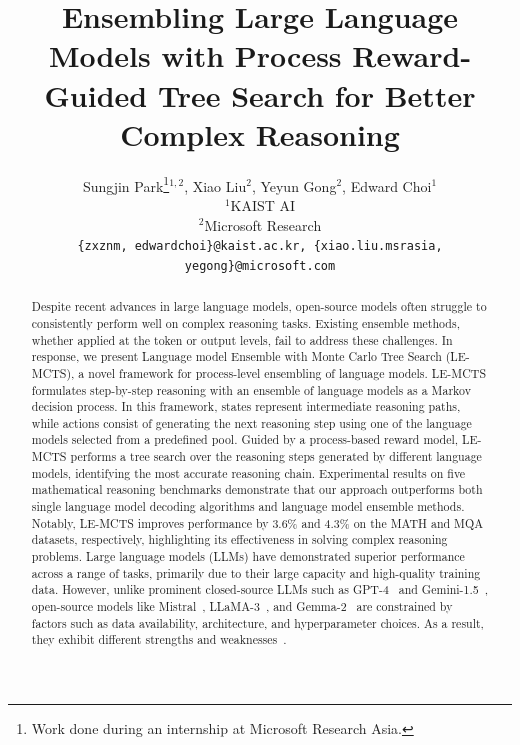 \documentclass[11pt]{article}
\title{Ensembling Large Language Models with Process Reward-Guided Tree Search for Better Complex Reasoning}
\author{
  Sungjin Park\thanks{Work done during an internship at Microsoft Research Asia.}$^{1,2}$, Xiao Liu$^{2}$, Yeyun Gong$^{2}$, Edward Choi$^{1}$ \\
  $^{1}$KAIST AI \\
  $^{2}$Microsoft Research \\
  \texttt{\{zxznm, edwardchoi\}@kaist.ac.kr, \{xiao.liu.msrasia, yegong\}@microsoft.com}\\
}
\begin{document}
\maketitle
\begin{abstract}
Despite recent advances in large language models, open-source models often struggle to consistently perform well on complex reasoning tasks. 
Existing ensemble methods, whether applied at the token or output levels, fail to address these challenges.
In response, we present Language model Ensemble with Monte Carlo Tree Search (LE-MCTS), a novel framework for process-level ensembling of language models. 
LE-MCTS formulates step-by-step reasoning with an ensemble of language models as a Markov decision process. 
In this framework, states represent intermediate reasoning paths, while actions consist of generating the next reasoning step using one of the language models selected from a predefined pool. 
Guided by a process-based reward model, LE-MCTS performs a tree search over the reasoning steps generated by different language models, identifying the most accurate reasoning chain. 
Experimental results on five mathematical reasoning benchmarks demonstrate that our approach outperforms both single language model decoding algorithms and language model ensemble methods.
Notably, LE-MCTS improves performance by 3.6\% and 4.3\% on the MATH and MQA datasets, respectively, highlighting its effectiveness in solving complex reasoning problems.
Large language models (LLMs) have demonstrated superior performance across a range of tasks, primarily due to their large capacity and high-quality training data. 
However, unlike prominent closed-source LLMs such as GPT-4~\citep{openai-etal-2023-gpt4} and Gemini-1.5~\cite{gemini-etal-2024-gemini}, open-source models like Mistral~\citep{jiang-etal-2023-mistral}, LLaMA-3~\citep{dubey-etal-2024-llama3}, and Gemma-2~\citep{gemma-etal-2024-gemma2} are constrained by factors such as data availability, architecture, and hyperparameter choices.
As a result, they exhibit different strengths and weaknesses~\citep{jiang-etal-2023-llm}. 




\end{abstract}
\end{document}
